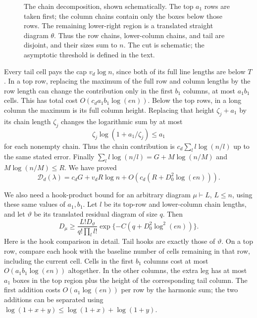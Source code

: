 \begin{figure}[t]
\centering

\caption{The chain decomposition, shown schematically. The top $a_1$
rows are taken first; the column chains contain only the boxes below
those rows. The remaining lower-right region is a translated straight
diagram $\theta$. Thus the row chains, lower-column chains, and tail
are disjoint, and their sizes sum to $n$. The cut is schematic; the
asymptotic threshold is defined in the text.}
\label{fig:hybrid-chains}
\end{figure}

Every tail cell pays the cap $v_d\log n$, since both of its full
line lengths are below $T$. In a top row, replacing the maximum
of the full row and column lengths by the row length can change
the contribution only in the first $b_1$ columns, at most $a_1b_1$
cells. This has total cost $O(c_d a_1b_1\log(en))$.
Below the top rows, in a long column the maximum is its full
column height. Replacing that height $\zeta_j+a_1$ by its chain
length $\zeta_j$ changes the logarithmic sum by at most
\[
 \zeta_j\log(1+a_1/\zeta_j)\le a_1
\]
for each nonempty chain. Thus the chain contribution is
$c_d\sum_l l\log(n/l)$ up to the same stated error.
Finally $\sum_l l\log(n/l)=G+M\log(n/M)$ and
$M\log(n/M)\le R$. We have proved
\begin{equation}\label{rec:hybrid-arm-weight}
 \mathcal D_d(\lambda)
 =c_dG+v_dR\log n+O(c_d(R+D_0^2\log(en))).
\end{equation}

We also need a hook-product bound for an arbitrary diagram
$\mu\vdash L$, $L\le n$, using these same values of $a_1,b_1$.
Let $l$ be its top-row and lower-column chain lengths, and let
$\vartheta$ be its translated residual diagram of size $q$.
Then
\begin{equation}\label{rec:hybrid-arm-hook}
 D_\mu\ge\frac{L!D_\vartheta}{q!\prod_l l!}
             \exp\{-C(q+D_0^2\log^2(en))\}.
\end{equation}
Here is the hook comparison in detail. Tail hooks are exactly those
of $\vartheta$. On a top row, compare each hook with the baseline
number of cells remaining in that row, including the current cell.
Cells in the first $b_1$ columns cost at most
$O(a_1b_1\log(en))$ altogether. In the other columns, the extra
leg has at most $a_1$ boxes in the top region plus the height of the
corresponding tail column. The first addition costs
$O(a_1\log(en))$ per row by the harmonic sum; the two additions can
be separated using $\log(1+x+y)\le\log(1+x)+\log(1+y)$.


